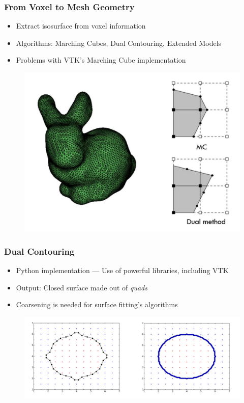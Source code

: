 \begin{frame}

	\frametitle{From Voxel to Mesh Geometry}
	
	\begin{itemize}
	\item Extract isosurface from voxel information
	\item Algorithms: Marching Cubes, Dual Contouring, Extended Models
	\item Problems with VTK's Marching Cube implementation
	\end{itemize}
	\begin{figure}
	\includegraphics[scale=0.35]{Pictures/bunny_MC.pdf}
	\end{figure}
	
\end{frame}

\begin{frame}

	\frametitle{Dual Contouring}
	
	\begin{itemize}
	\item Python implementation --- Use of powerful libraries, including VTK
	\item Output: Closed surface made out of \textit{quads}
	\item Coarsening is needed for surface fitting's algorithms
	\end{itemize}
	\begin{figure}
	\includegraphics[scale=0.35]{Pictures/DC/DC_1.pdf}
	\end{figure}
	
\end{frame}

